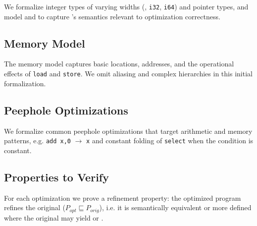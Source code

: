 We formalize integer types of varying widths (\eg, \texttt{i32},
\texttt{i64}) and pointer types, and model \poison and \vundef to capture
\llvm's semantics relevant to optimization correctness.

\subsection{Memory Model}

The memory model captures basic locations, addresses, and the operational
effects of \texttt{load} and \texttt{store}. We omit aliasing and complex
hierarchies in this initial formalization.


\subsection{Peephole Optimizations}

We formalize common peephole optimizations that target arithmetic and
memory patterns, e.g. \texttt{add x,0} $\rightarrow$ \texttt{x} and
constant folding of \texttt{select} when the condition is constant.

\subsection{Properties to Verify}

For each optimization we prove a refinement property: the optimized
program refines the original ($P_{opt}\sqsubseteq P_{orig}$), i.e. it is
semantically equivalent or more defined where the original may yield
\poison{} or \vundef.

